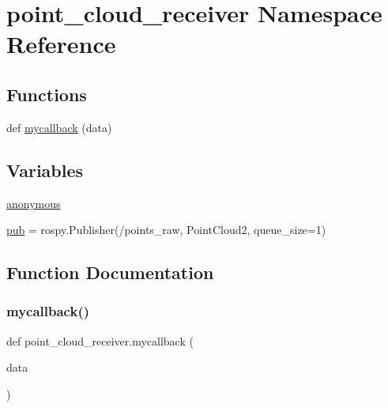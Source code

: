 \hypertarget{namespacepoint__cloud__receiver}{}\section{point\+\_\+cloud\+\_\+receiver Namespace Reference}
\label{namespacepoint__cloud__receiver}
\subsection*{Functions}
\begin{DoxyCompactItemize}
\item 
def \hyperlink{namespacepoint__cloud__receiver_ae1f4d09e83639f1c6cc5c6a01e5c93c7}{mycallback} (data)
\end{DoxyCompactItemize}
\subsection*{Variables}
\begin{DoxyCompactItemize}
\item 
\hyperlink{namespacepoint__cloud__receiver_a24216fb78df876244247dbd01fa04733}{anonymous}
\item 
\hyperlink{namespacepoint__cloud__receiver_a02fb03398de59f401d26b98cec00eaab}{pub} = rospy.\+Publisher(\textquotesingle{}/points\+\_\+raw\textquotesingle{}, Point\+Cloud2, queue\+\_\+size=1)
\end{DoxyCompactItemize}


\subsection{Function Documentation}
\mbox{\label{namespacepoint__cloud__receiver_ae1f4d09e83639f1c6cc5c6a01e5c93c7}} 
\subsubsection{\texorpdfstring{mycallback()}{mycallback()}}
{\footnotesize\ttfamily def point\+\_\+cloud\+\_\+receiver.\+mycallback (\begin{DoxyParamCaption}\item[{}]{data }\end{DoxyParamCaption})}



